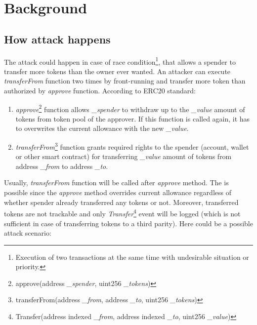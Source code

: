 \section{Background}
\subsection{How attack happens}
The attack could happen in case of race condition\footnote{Execution of two transactions at the same time with undesirable situation or priority.}, that allows a spender to transfer more tokens than the owner ever wanted. An attacker can execute \textit{transferFrom} function two times by front-running and transfer more token than authorized by \textit{approve} function. According to ERC20 standard:
\begin{enumerate}[label=(\alph*)]
	\item \textit{approve}\footnote{approve(address \textit{\_spender}, uint256 \textit{\_tokens})} function allows \textit{\_spender} to withdraw up to the \textit{\_value} amount of tokens from token pool of the approver. If this function is called again, it has to overwrites the current allowance with the new \textit{\_value}.
	\item \textit{transferFrom}\footnote{transferFrom(address \textit{\_from}, address \textit{\_to}, uint256 \textit{\_tokens})} function grants required rights to the spender (account, wallet or other smart contract) for transferring \textit{\_value} amount of tokens from address \textit{\_from} to address \textit{\_to}.
\end{enumerate}
Usually, \textit{transferFrom} function will be called after \textit{approve} method. The is possible since the \textit{approve} method overrides current allowance regardless of whether spender already transferred any tokens or not. Moreover, transferred tokens are not trackable and only \textit{Transfer}\footnote{Transfer(address indexed \textit{\_from}, address indexed \textit{\_to}, uint256 \textit{\_value})} event will be logged (which is not sufficient in case of transferring tokens to a third parity). Here could be a possible attack scenario:

